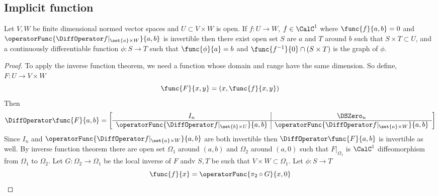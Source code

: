 \subsection{Implicit function}
\begin{theorem}
    Let \(V,W\) be finite dimensional normed vector spaces and \(U \subset V \times W\) is open. If \(f: U \to W\), \(f \in \CalC^1\) where \(\func{f}{a,b} = 0\) and \(\operatorFunc{\DiffOperator f|_{\set{a} \times W}}{a,b}\) is invertible then there exist open set \(S\) are \(a\) and \(T\) around \(b\) such that \(S \times T \subset U\), and a continuously differentiable function \(\phi: S \to T\) such that \(\func{\phi}{a} = b\) and \(\func{f^{-1}}{0} \cap (S \times T)\) is the graph of \(\phi\).
\end{theorem}

\begin{proof}
    To apply the inverse function theorem, we need a function whose domain and range have the same dimension. So define, \(F: U \to V \times W\)
    \begin{equation*}
        \func{F}{x,y} = (x,\func{f}{x,y})
    \end{equation*}
    Then
    \begin{equation*}
        \DiffOperator \func{F}{a,b} = \left[\begin{array}{c|c}
                I_n                                                     & \DSZero_n                                               \\ \hline
                \operatorFunc{\DiffOperator f|_{\set{b} \times U}}{a,b} & \operatorFunc{\DiffOperator f|_{\set{a} \times W}}{a,b}
            \end{array}\right]
    \end{equation*}
    Since \(I_n\) and \(\operatorFunc{\DiffOperator f|_{\set{a} \times W}}{a,b}\) are both invertible then \(\DiffOperator \func{F}{a,b}\) is invertible as well. By inverse function theorem there are open set \(\Omega_1\) around \((a,b)\) and \(\Omega_2\) around \((a,0)\) such that \(F|_{\Omega_1}\) is \(\CalC^1\) diffeomorphism from \(\Omega_1\) to \(\Omega_2\). Let \(G: \Omega_2 \to \Omega_1\) be the local inverse of \(F\) andv \(S,T\) be such that \(V \times W \subset \Omega_1\). Let \(\phi : S \to T\)
    \begin{equation*}
        \func{f}{x} = \operatorFunc{ \pi_2 \circ G}{x,0}
    \end{equation*}
\end{proof}

